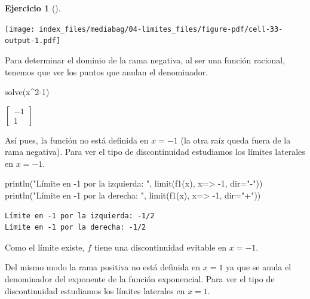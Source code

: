 \documentclass[
  a4paper,
]{scrreport}
\newenvironment{Shaded}{\begin{snugshade}}{\end{snugshade}}
\newcommand{\FloatTok}[1]{\textcolor[rgb]{0.68,0.00,0.00}{#1}}
\newcommand{\FunctionTok}[1]{\textcolor[rgb]{0.28,0.35,0.67}{#1}}
\newcommand{\NormalTok}[1]{\textcolor[rgb]{0.00,0.23,0.31}{#1}}
\newcommand{\OperatorTok}[1]{\textcolor[rgb]{0.37,0.37,0.37}{#1}}
\newcommand{\StringTok}[1]{\textcolor[rgb]{0.13,0.47,0.30}{#1}}
\theoremstyle{definition}
\newtheorem{exercise}{Ejercicio}[chapter]
\theoremstyle{remark}
\begin{document}
\begin{exercise}[]
\begin{tcolorbox}
\texttt{[image: index\_files/mediabag/04-limites\_files/figure-pdf/cell-33-output-1.pdf]}

Para determinar el dominio de la rama negativa, al ser una función
racional, tenemos que ver los puntos que anulan el denominador.

\begin{Shaded}
\begin{Highlighting}[]
\FunctionTok{solve}\NormalTok{(x}\OperatorTok{\^{}}\FloatTok{2}\OperatorTok{{-}}\FloatTok{1}\NormalTok{)}
\end{Highlighting}
\end{Shaded}

$\left[\begin{smallmatrix}-1\\1\end{smallmatrix}\right]$

Así pues, la función no está definida en \(x=-1\) (la otra raíz queda
fuera de la rama negativa). Para ver el tipo de discontinuidad
estudiamos los límites laterales en \(x=-1\).

\begin{Shaded}
\begin{Highlighting}[]
\FunctionTok{println}\NormalTok{(}\StringTok{"Límite en {-}1 por la izquierda: "}\NormalTok{, }\FunctionTok{limit}\NormalTok{(}\FunctionTok{f1}\NormalTok{(x), x}\OperatorTok{=\textgreater{}} \OperatorTok{{-}}\FloatTok{1}\NormalTok{, dir}\OperatorTok{=}\StringTok{"{-}"}\NormalTok{))}
\FunctionTok{println}\NormalTok{(}\StringTok{"Límite en {-}1 por la derecha: "}\NormalTok{, }\FunctionTok{limit}\NormalTok{(}\FunctionTok{f1}\NormalTok{(x), x}\OperatorTok{=\textgreater{}} \OperatorTok{{-}}\FloatTok{1}\NormalTok{, dir}\OperatorTok{=}\StringTok{"+"}\NormalTok{))}
\end{Highlighting}
\end{Shaded}

\begin{verbatim}
Límite en -1 por la izquierda: -1/2
Límite en -1 por la derecha: -1/2
\end{verbatim}

Como el límite existe, \(f\) tiene una discontinuidad evitable en
\(x=-1\).

Del mismo modo la rama positiva no está definida en \(x=1\) ya que se
anula el denominador del exponente de la función exponencial. Para ver
el tipo de discontinuidad estudiamos los límites laterales en \(x=1\).


\end{tcolorbox}
\end{exercise}
\end{document}
